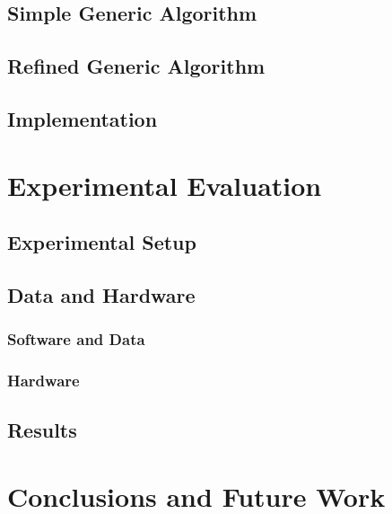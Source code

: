 \subsection{Simple Generic Algorithm}
\label{subsec:simple_algo}

\subsection{Refined Generic Algorithm}
\label{subsec:refined_algo}

\subsection{Implementation}
\label{subsec:implementation}
%
%



\section{Experimental Evaluation}
\label{sec:evaluation}
%
%
\subsection{Experimental Setup}
\label{subsec:exp_setup}

\subsection{Data and Hardware}
\label{subsec:hardware}

\subsubsection{Software and Data}
\label{subsubsec:software}

\subsubsection{Hardware}
\label{subsubsec:hardware}

\subsection{Results}
\label{subsec:results}

\section{Conclusions and Future Work}
\label{sec:discussion_conclusion}


